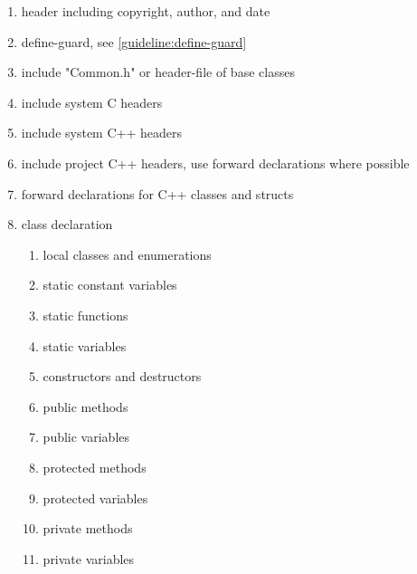 \documentclass[a4paper,11pt,oneside]{scrbook}
\newcommand{\trfile}[1]{"#1"}
\begin{document}
\begin{enumerate}
  \item
    header including copyright, author, and date

  \item
    define-guard, see \ref{guideline:define-guard}

  \item
    include \trfile{Common.h} or header-file of base classes

  \item
    include system C headers

  \item
    include system C++ headers

  \item
    include project C++ headers, use forward declarations where possible

  \item
    forward declarations for C++ classes and structs

  \item
    class declaration

    \begin{enumerate}
      \item
        local classes and enumerations

      \item
        static constant variables

      \item
        static functions

      \item
        static variables

      \item
        constructors and destructors

      \item
        public methods

      \item
        public variables

      \item
        protected methods

      \item
        protected variables

      \item
        private methods

      \item
        private variables
    \end{enumerate}
\end{enumerate}
\end{document}
